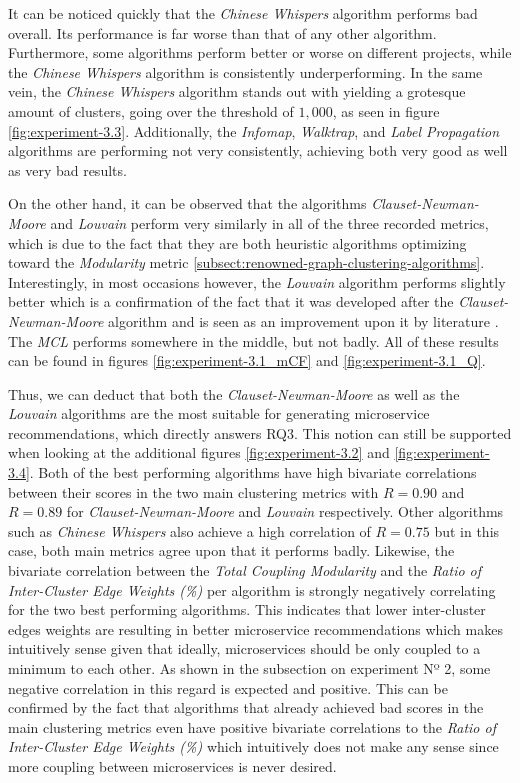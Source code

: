 \documentclass[12pt,a4paper]{report}
\begin{document}
It can be noticed quickly that the \textit{Chinese Whispers} algorithm performs
bad overall. Its performance is far worse than that of any other algorithm.
Furthermore, some algorithms perform better or worse on different projects,
while the \textit{Chinese Whispers} algorithm is consistently underperforming.
In the same vein, the \textit{Chinese Whispers} algorithm
stands out with yielding a grotesque amount of clusters,
going over the threshold of $1,000$, as seen in figure \ref{fig:experiment-3.3}.
Additionally, the \textit{Infomap}, \textit{Walktrap},
and \textit{Label Propagation} algorithms are performing not very consistently,
achieving both very good as well as very bad results.

On the other hand, it can be observed that the algorithms \textit{Clauset-Newman-Moore}
and \textit{Louvain} perform very similarly in all of the three recorded metrics,
which is due to the fact that they are both heuristic algorithms optimizing toward
the \textit{Modularity} metric \ref{subsect:renowned-graph-clustering-algorithms}.
Interestingly, in most occasions however, the \textit{Louvain} algorithm performs
slightly better which is a confirmation of the fact that it was developed after
the \textit{Clauset-Newman-Moore} algorithm and is seen as an improvement upon it
by literature \cite{lancichinetti2009community}.
The \textit{MCL} performs somewhere in the middle, but not badly.
All of these results can be found in figures \ref{fig:experiment-3.1_mCF} and
\ref{fig:experiment-3.1_Q}.

Thus, we can deduct that both the \textit{Clauset-Newman-Moore} as well as the
\textit{Louvain} algorithms are the most suitable for generating microservice
recommendations, which directly answers RQ3.
This notion can still be supported when looking at the additional figures
\ref{fig:experiment-3.2} and \ref{fig:experiment-3.4}.
Both of the best performing algorithms have high bivariate correlations between
their scores in the two main clustering metrics with \(R = 0.90\) and \(R = 0.89\)
for \textit{Clauset-Newman-Moore} and \textit{Louvain} respectively.
Other algorithms such as \textit{Chinese Whispers} also achieve a high correlation
of \(R = 0.75\) but in this case, both main metrics agree upon that it performs badly.
Likewise, the bivariate correlation between the \textit{Total Coupling Modularity}
and the \textit{Ratio of Inter-Cluster Edge Weights (\%)} per algorithm is strongly
negatively correlating for the two best performing algorithms.
This indicates that lower inter-cluster edges weights are resulting
in better microservice recommendations which makes intuitively sense given that ideally,
microservices should be only coupled to a minimum to each other. As shown in
the subsection on experiment Nº 2, some negative correlation in this regard is
expected and positive. This can be confirmed by the fact that algorithms that
already achieved bad scores in the main clustering metrics even have positive
bivariate correlations to the \textit{Ratio of Inter-Cluster Edge Weights (\%)}
which intuitively does not make any sense since more coupling between microservices
is never desired.
\end{document}
